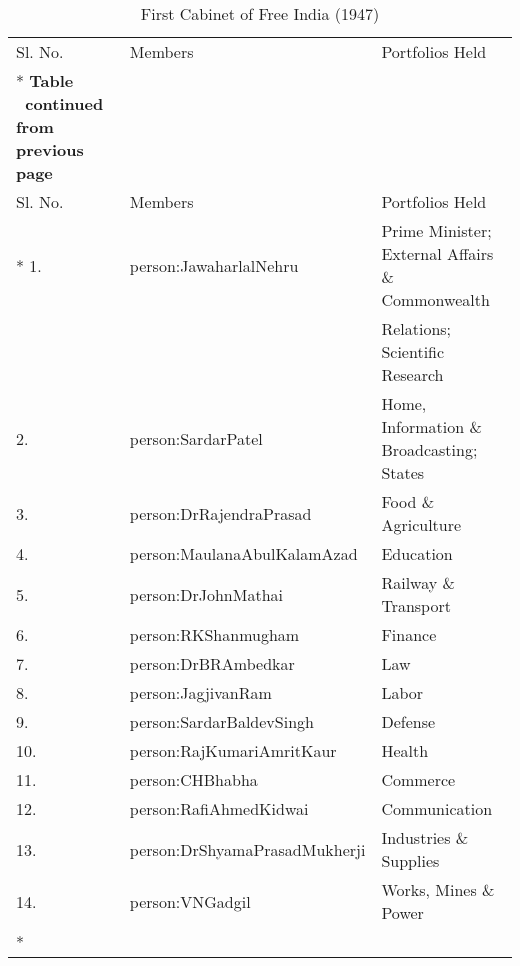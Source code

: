 \begin{longtable}[c]{@{}|l|l|l|@{}}
	\caption{First Cabinet of Free India (1947)}
	\label{tbl:firstCabinetOfFreeIndia}\\
	\toprule
	Sl. No. & Members & Portfolios Held \\* \midrule
	\endfirsthead
	\multicolumn{3}{c}%
	{{\bfseries Table \thetable\ continued from previous page}} \\
	\toprule
	Sl. No. & Members & Portfolios Held \\* \midrule
	\endhead
	\bottomrule
	\endfoot
	\endlastfoot
	1. & \gls{person:JawaharlalNehru} & Prime Minister; External Affairs \& Commonwealth \\
	&                           & Relations; Scientific Research \\
	2. & \gls{person:SardarPatel} & Home, Information \& Broadcasting; States \\
	3. & \gls{person:DrRajendraPrasad} & Food \& Agriculture \\
	4. & \gls{person:MaulanaAbulKalamAzad} & Education \\
	5. & \gls{person:DrJohnMathai} & Railway \& Transport \\
	6. & \gls{person:RKShanmugham} & Finance \\
	7. & \gls{person:DrBRAmbedkar} & Law \\
	8. & \gls{person:JagjivanRam} & Labor \\
	9. & \gls{person:SardarBaldevSingh} & Defense \\
	10. & \gls{person:RajKumariAmritKaur} & Health \\
	11. & \gls{person:CHBhabha} & Commerce \\
	12. & \gls{person:RafiAhmedKidwai} & Communication \\
	13. & \gls{person:DrShyamaPrasadMukherji} & Industries \& Supplies \\
	14. & \gls{person:VNGadgil} & Works, Mines \& Power \\* \bottomrule
\end{longtable}

\twocolumn
\cleardoublepage